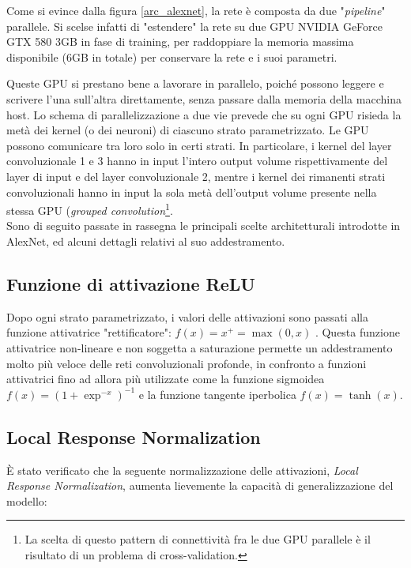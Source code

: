 Come si evince dalla figura \ref{arc_alexnet}, la rete è composta da due "\textit{pipeline}" parallele. Si scelse infatti di "estendere" la rete su due GPU NVIDIA\textsuperscript{\textregistered} GeForce\textsuperscript{\textregistered} GTX 580 3GB in fase di training, per raddoppiare la memoria massima disponibile (6GB in totale) per conservare la rete e i suoi parametri.

Queste GPU si prestano bene a lavorare in parallelo, poiché possono leggere e scrivere l'una sull'altra direttamente, senza passare dalla memoria della macchina host. Lo schema di parallelizzazione a due vie prevede che su ogni GPU risieda la metà dei kernel (o dei neuroni) di ciascuno strato parametrizzato. Le GPU possono comunicare tra loro solo in certi strati. In particolare, i kernel del layer convoluzionale 1 e 3 hanno in input l'intero output volume rispettivamente del layer di input e del layer convoluzionale 2, mentre i kernel dei rimanenti strati convoluzionali hanno in input la sola metà dell'output volume presente nella stessa GPU (\textit{grouped convolution}\footnote{La scelta di questo pattern di connettività fra le due GPU parallele è il risultato di un problema di cross-validation.}.\\

Sono di seguito passate in rassegna le principali scelte architetturali introdotte in AlexNet, ed alcuni dettagli relativi al suo addestramento.

\subsection{Funzione di attivazione ReLU}
Dopo ogni strato parametrizzato, i valori delle attivazioni sono passati alla funzione attivatrice "rettificatore": $f(x)=x^{+}=\max(0,x)$ \cite{nairhinton}. Questa funzione attivatrice non-lineare e non soggetta a saturazione permette un addestramento molto più veloce delle reti convoluzionali profonde, in confronto a funzioni attivatrici fino ad allora più utilizzate come la funzione sigmoidea $f(x)=(1+\exp^{-x})^{-1}$ e la funzione tangente iperbolica $f(x)=\tanh(x)$.

\subsection{Local Response Normalization}
È stato verificato che la seguente normalizzazione delle attivazioni, \textit{Local Response Normalization}, aumenta lievemente la capacità di generalizzazione del modello:

